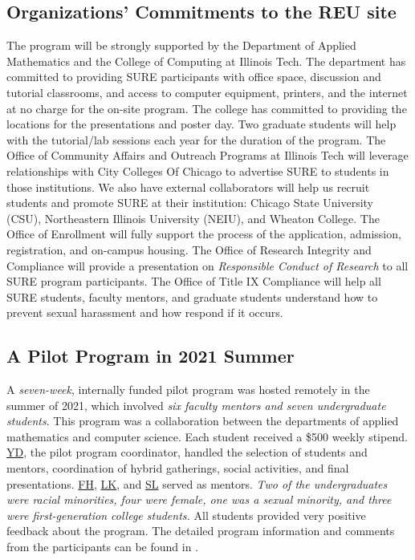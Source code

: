\documentclass[11pt]{NSFamsart}
\newcommand{\FH}{\hyperlink{FHlink}{FH}\xspace}
\newcommand{\YD}{\hyperlink{YDlink}{YD}\xspace}
\newcommand{\LK}{\hyperlink{LKlink}{LK}\xspace}
\newcommand{\SL}{\hyperlink{SLlink}{SL}\xspace}
\begin{document}
\subsection{Organizations' Commitments to the REU site}
The program will be strongly supported by the Department of Applied Mathematics and the College of Computing at Illinois Tech. The department has committed to providing SURE participants with office space, discussion and tutorial classrooms, and access to computer equipment, printers, and the internet at no charge for the on-site program. The college has committed to providing the locations for the presentations and poster day. Two graduate students will help with the tutorial/lab sessions each year for the duration of the program. The Office of Community Affairs and Outreach Programs at Illinois Tech will leverage relationships with City Colleges Of Chicago to
advertise SURE to students in those institutions.
We also have external collaborators will help us recruit students and promote SURE at their institution: Chicago State University (CSU), Northeastern Illinois University (NEIU), and Wheaton College.
The Office of Enrollment will fully support the process of the application, admission, registration, and on-campus housing. 
The Office of Research Integrity and Compliance will provide a presentation on \emph{Responsible Conduct of Research} to all SURE program participants. The Office of Title IX Compliance will help all SURE students, faculty mentors, and graduate students understand how to prevent sexual harassment and how respond if it occurs.

\subsection{A Pilot  Program in 2021 Summer}

A \emph{seven-week}, internally funded pilot program was hosted remotely in the summer of 2021, which involved \emph{six faculty mentors and seven undergraduate students}. This program was a collaboration between the departments of applied mathematics and computer science. Each student received a \$500 weekly stipend. \YD, the pilot program coordinator, handled the selection of students and mentors, coordination of hybrid gatherings, social activities, and final presentations. \FH, \LK, and \SL served as mentors. \emph{Two of the undergraduates were racial minorities, four were female, one was a sexual minority, and three were first-generation college students.} All students provided very positive feedback about the program.
The detailed program information and comments from the participants can be found in \cite{SUREWeb}.
\end{document}
